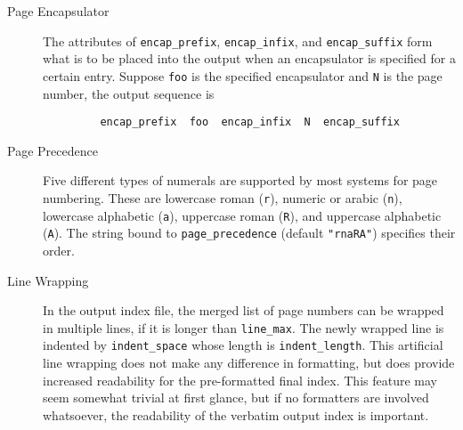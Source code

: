 \begin{description}
\item[Page Encapsulator]  The attributes of
\verb|encap_prefix|, \verb|encap_infix|, and \verb|encap_suffix|
form what is to be placed into the output
 when an encapsulator is specified
for a certain entry.  Suppose \verb|foo| is the specified encapsulator
and \verb|N| is the page number, the output sequence is
\begin{verbatim}
	     encap_prefix  foo  encap_infix  N  encap_suffix
\end{verbatim}

\item[Page Precedence]  Five different types of numerals are
supported by most systems for page numbering.  These are
lowercase roman (\verb|r|), numeric or arabic (\verb|n|),
lowercase alphabetic (\verb|a|), uppercase roman (\verb|R|),
and uppercase alphabetic (\verb|A|).  The string bound to
\verb|page_precedence| (default \verb|"rnaRA"|)
specifies their order.

\item[Line Wrapping]  In the output index file, 
the merged list of page numbers	can be wrapped in multiple lines,
if it is longer than \verb|line_max|.  The newly wrapped
line is indented by \verb|indent_space| whose length is
\verb|indent_length|.  This artificial line wrapping does not
make any difference in formatting, but does provide increased
readability for the pre-formatted final index.
This feature may seem somewhat trivial at first glance, but if no
formatters are involved whatsoever, the readability of the
verbatim output index is important.

\end{description}

